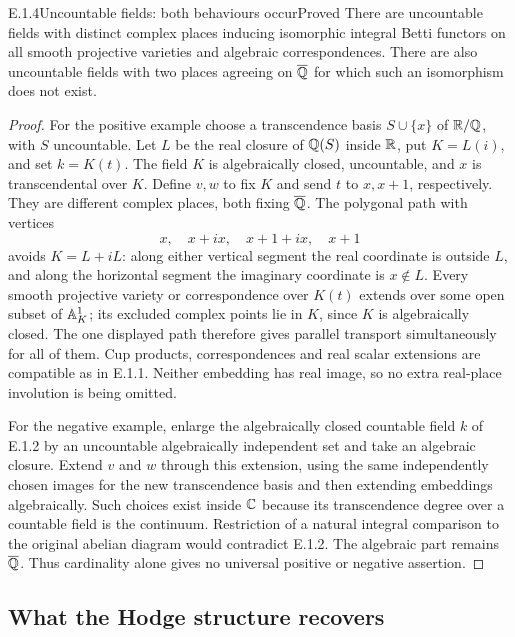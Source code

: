 \begin{result}{E.1.4}{Uncountable fields: both behaviours occur}{Proved}
There are uncountable fields with distinct complex places inducing isomorphic integral Betti functors on all smooth projective varieties and algebraic correspondences. There are also uncountable fields with two places agreeing on $\overline{\mathbb Q}$ for which such an isomorphism does not exist.
\end{result}
\begin{proof}
For the positive example choose a transcendence basis $S\cup\{x\}$ of $\mathbb R/\mathbb Q$, with $S$ uncountable. Let $L$ be the real closure of $\mathbb Q(S)$ inside $\mathbb R$, put $K=L(i)$, and set $k=K(t)$. The field $K$ is algebraically closed, uncountable, and $x$ is transcendental over $K$. Define $v,w$ to fix $K$ and send $t$ to $x,x+1$, respectively. They are different complex places, both fixing $\overline{\mathbb Q}$. The polygonal path with vertices
\[
 x,\quad x+ix,\quad x+1+ix,\quad x+1
\]
avoids $K=L+iL$: along either vertical segment the real coordinate is outside $L$, and along the horizontal segment the imaginary coordinate is $x\notin L$. Every smooth projective variety or correspondence over $K(t)$ extends over some open subset of $\mathbb A^1_K$; its excluded complex points lie in $K$, since $K$ is algebraically closed. The one displayed path therefore gives parallel transport simultaneously for all of them. Cup products, correspondences and real scalar extensions are compatible as in E.1.1. Neither embedding has real image, so no extra real-place involution is being omitted.

For the negative example, enlarge the algebraically closed countable field $k$ of E.1.2 by an uncountable algebraically independent set and take an algebraic closure. Extend $v$ and $w$ through this extension, using the same independently chosen images for the new transcendence basis and then extending embeddings algebraically. Such choices exist inside $\mathbb C$ because its transcendence degree over a countable field is the continuum. Restriction of a natural integral comparison to the original abelian diagram would contradict E.1.2. The algebraic part remains $\overline{\mathbb Q}$. Thus cardinality alone gives no universal positive or negative assertion.
\end{proof}

\subsection{What the Hodge structure recovers}

